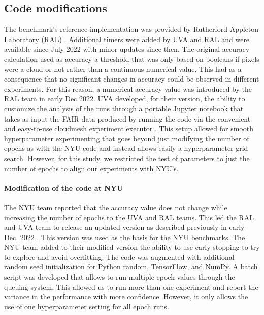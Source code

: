 \documentclass[sigplan,screen]{acmart}
\begin{document}
\subsection{Code modifications}
\label{sec:code}

The benchmark's reference implementation was provided by Rutherford Appleton Laboratory (RAL) \cite{Thiyagalingam2022AIBF,github-laszewsk-mlcommons}. 
Additional timers were added by UVA and RAL and were available since July 2022 with minor updates since then. 
The original accuracy calculation used as accuracy a threshold that was only based on booleans if pixels were a cloud or not rather than a continuous numerical value. This had as a consequence that no significant changes in accuracy could be observed in different experiments. For this reason, a numerical accuracy value was introduced by the RAL team in early Dec 2022. 
UVA developed, for their version, the ability to customize the analysis of the runs through a portable Jupyter notebook that takes as input the FAIR \cite{www-fair} data produced by running the code via the convenient and easy-to-use cloudmesh experiment executor \cite{github-cloudmesh-ee,las-2023-escience-cloudmask,las-2023-ai-workflow}. This setup allowed for smooth hyperparameter experimenting that goes beyond just modifying the number of epochs as with the NYU code and instead allows easily a hyperparameter grid search. However, for this study, we restricted the test of parameters to just the number of epochs to align our experiments with NYU's.

\paragraph{Modification of the code at NYU} 
The NYU team reported that the accuracy value does not change while increasing the number of epochs to the UVA and RAL teams. This led the RAL and UVA team to release an updated version as described previously in early Dec. 2022 \cite{www-mlcommons-science-github}. This version was used as the basis for the NYU benchmarks.
The NYU team added to their modified version the ability to use early stopping \cite{Caruana2000OverfittingIN} to try to explore and avoid overfitting. The code was augmented with additional random seed initialization for Python random, TensorFlow, and NumPy. A batch script was developed that allows to run multiple epoch values through the queuing system. This allowed us to run more than one experiment and report the variance in the performance with more confidence. However, it only allows the use of one hyperparameter setting for all epoch runs.
\end{document}

